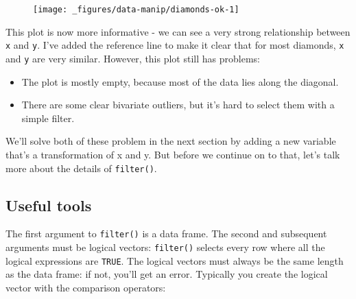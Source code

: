 \begin{Shaded}
\begin{Highlighting}[]
\StringTok{ }\StringTok{ }\StringTok{ }\StringTok{ }\NormalTok{)}
\StringTok{  }\NormalTok{() +}
\StringTok{  }\NormalTok{(} \NormalTok{, } \NormalTok{, } \NormalTok{, } \NormalTok{)}
\end{Highlighting}
\end{Shaded}

\begin{figure}[H]
  \centering
  \texttt{[image: \_figures/data-manip/diamonds-ok-1]}
\end{figure}

This plot is now more informative - we can see a very strong
relationship between \texttt{x} and \texttt{y}. I've added the reference
line to make it clear that for most diamonds, \texttt{x} and \texttt{y}
are very similar. However, this plot still has problems:

\begin{itemize}
\item
  The plot is mostly empty, because most of the data lies along the
  diagonal.
\item
  There are some clear bivariate outliers, but it's hard to select them
  with a simple filter.
\end{itemize}

We'll solve both of these problem in the next section by adding a new
variable that's a transformation of x and y. But before we continue on
to that, let's talk more about the details of \texttt{filter()}.

\subsection{Useful tools}

The first argument to \texttt{filter()} is a data frame. The second and
subsequent arguments must be logical vectors: \texttt{filter()} selects
every row where all the logical expressions are \texttt{TRUE}. The
logical vectors must always be the same length as the data frame: if
not, you'll get an error. Typically you create the logical vector with
the comparison operators:

